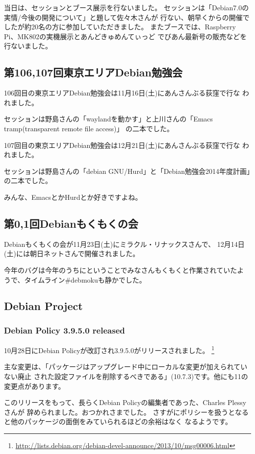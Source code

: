 \documentclass[mingoth,a4paper]{jsarticle}
\begin{document}
当日は、セッションとブース展示を行ないました。
セッションは「Debian7.0の実情/今後の開発について」と題して佐々木さんが
行ない、朝早くからの開催でしたが約20名の方に参加していただきました。
またブースでは、Raspberry Pi、MK802の実機展示とあんどきゅめんてぃっど
でびあん最新号の販売などを行ないました。

\subsection{第106,107回東京エリアDebian勉強会}

106回目の東京エリアDebian勉強会は11月16日(土)にあんさんぶる荻窪で行な
われました。

セッションは野島さんの「waylandを動かす」と上川さんの「Emacs tramp(transparent remote file access)」
の二本でした。

107回目の東京エリアDebian勉強会は12月21日(土)にあんさんぶる荻窪で行な
われました。

セッションは野島さんの「debian GNU/Hurd」と「Debian勉強会2014年度計画」の二本でした。

みんな、EmacsとかHurdとか好きですよね。

\subsection{第0,1回Debianもくもくの会}
Debianもくもくの会が11月23日(土)にミラクル・リナックスさんで、
12月14日(土)には朝日ネットさんで開催されました。

今年のバグは今年のうちにということでみなさんもくもくと作業されていたよ
うで、タイムライン\#debmokuも静かでした。

\subsection{Debian Project}
\subsubsection{Debian Policy 3.9.5.0 released}
10月28日にDebian Policyが改訂され3.9.5.0がリリースされました。
\footnote{\url{http://lists.debian.org/debian-devel-announce/2013/10/msg00006.html}}

主な変更は、「パッケージはアップグレード中にローカルな変更が加えられていない廃止
された設定ファイルを削除するべきである」(10.7.3)です。他にも11の変更点があります。

このリリースをもって、長らくDebian Policyの編集者であった、Charles Plessyさんが
辞められました。おつかれさまでした。
さすがにポリシーを扱うとなると他のパッケージの面倒をみていられるほどの余裕はなく
なるようです。
\end{document}
